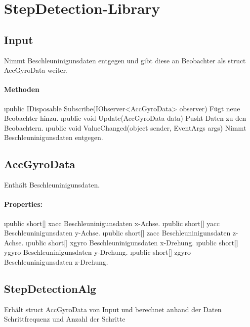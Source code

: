 \documentclass[../entwurf.tex]{subfiles}
\begin{document}
\section{StepDetection-Library}
    \subsection{Input}
        Nimmt Beschleuninigunsdaten entgegen und gibt diese an Beobachter als struct AccGyroData weiter.
        \paragraph{Methoden}
        \begin{itemize}
            \i{public IDisposable Subscribe(IObserver<AccGyroData> observer)} Fügt neue Beobachter hinzu.
            \i{public void Update(AccGyroData data)} Pusht Daten zu den Beobachtern.
            \i{public void ValueChanged(object sender, EventArgs args)} Nimmt Beschleuninigunsdaten entgegen.
        \end{itemize}


    \subsection{AccGyroData}
        Enthält Beschleuninigunsdaten.
        \paragraph{Properties:}
        \begin{itemize}
            \i{public short[] xacc} Beschleuninigunsdaten x-Achse.
            \i{public short[] yacc} Beschleuninigunsdaten y-Achse.
            \i{public short[] zacc} Beschleuninigunsdaten z-Achse.
            \i{public short[] xgyro} Beschleuninigunsdaten x-Drehung.
            \i{public short[] ygyro} Beschleuninigunsdaten y-Drehung.
            \i{public short[] zgyro} Beschleuninigunsdaten z-Drehung.
        \end{itemize}

    \subsection{StepDetectionAlg}
        Erhält struct AccGyroData von Input und berechnet anhand der Daten Schrittfrequenz und Anzahl der Schritte
\end{document}
